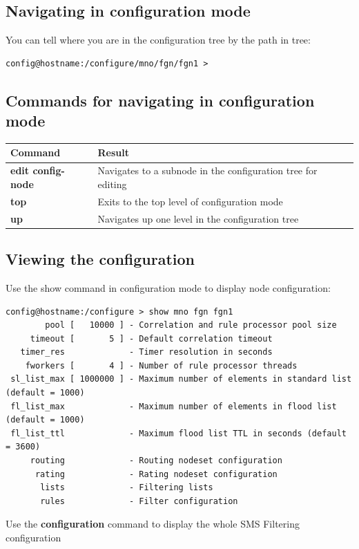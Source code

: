 \documentclass[a4paper,latin]{paper}
\begin{document}
\subsection{Navigating in configuration mode}

You can tell where you are in the configuration tree by the path in tree:
\begin{lstlisting}[style=BashInputStyle]
config@hostname:/configure/mno/fgn/fgn1 >
\end{lstlisting}

\subsection{Commands for navigating in configuration mode}

\begin{tabular}{ | l | l | }
	\hline
	Command 			& Result \\ \hline
	\textbf{edit config-node}	& Navigates to a subnode in the configuration tree for editing \\
	\textbf{top}			& Exits to the top level of configuration mode \\
	\textbf{up}			& Navigates up one level in the configuration tree \\
	\hline
	
\end{tabular}

\subsection{Viewing the configuration}

Use the show command in configuration mode to display node configuration:
\begin{lstlisting}[style=BashInputStyle]
config@hostname:/configure > show mno fgn fgn1 
        pool [   10000 ] - Correlation and rule processor pool size
     timeout [       5 ] - Default correlation timeout             
   timer_res             - Timer resolution in seconds
    fworkers [       4 ] - Number of rule processor threads
 sl_list_max [ 1000000 ] - Maximum number of elements in standard list (default = 1000)
 fl_list_max             - Maximum number of elements in flood list (default = 1000)
 fl_list_ttl             - Maximum flood list TTL in seconds (default = 3600)
     routing             - Routing nodeset configuration                     
      rating             - Rating nodeset configuration 
       lists             - Filtering lists             
       rules             - Filter configuration
\end{lstlisting}
Use the \textbf{configuration} command to display the whole SMS Filtering configuration
\end{document}
